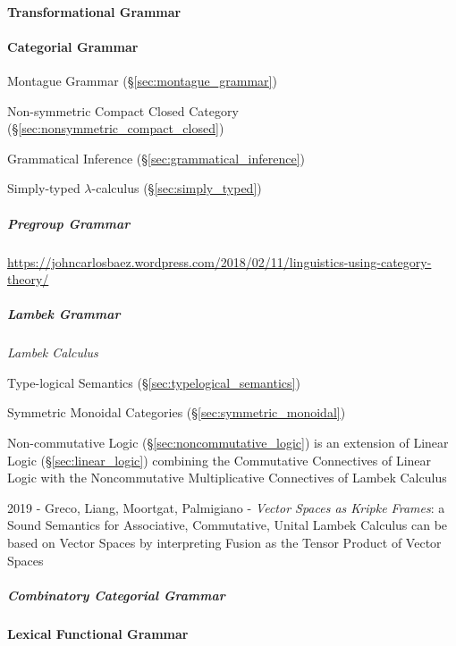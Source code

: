 \paragraph{Transformational Grammar}\label{sec:transformational_grammar}
\hfill



\paragraph{Categorial Grammar}\label{sec:categorial_grammar}\hfill

Montague Grammar (\S\ref{sec:montague_grammar})

Non-symmetric Compact Closed Category (\S\ref{sec:nonsymmetric_compact_closed})

\fist Grammatical Inference (\S\ref{sec:grammatical_inference})

\fist Simply-typed $\lambda$-calculus (\S\ref{sec:simply_typed})



\subparagraph{Pregroup Grammar}\label{sec:pregroup_grammar}\hfill

\url{https://johncarlosbaez.wordpress.com/2018/02/11/linguistics-using-category-theory/}



\subparagraph{Lambek Grammar}\label{sec:lambek_grammar}\hfill

\emph{Lambek Calculus}

Type-logical Semantics (\S\ref{sec:typelogical_semantics})

Symmetric Monoidal Categories (\S\ref{sec:symmetric_monoidal})

\fist Non-commutative Logic (\S\ref{sec:noncommutative_logic}) is an extension
of Linear Logic (\S\ref{sec:linear_logic}) combining the Commutative Connectives
of Linear Logic with the Noncommutative Multiplicative Connectives of Lambek
Calculus

2019 - Greco, Liang, Moortgat, Palmigiano -
\emph{Vector Spaces as Kripke Frames}: a Sound Semantics for Associative,
Commutative, Unital Lambek Calculus can be based on Vector Spaces by
interpreting Fusion as the Tensor Product of Vector Spaces



\subparagraph{Combinatory Categorial Grammar}\hfill
\label{sec:combinatory_categorial}



\paragraph{Lexical Functional Grammar}\label{sec:lexical_functional}
\hfill

